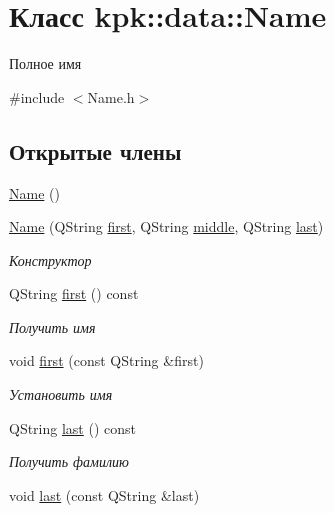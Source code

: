\hypertarget{classkpk_1_1data_1_1_name}{}\section{Класс kpk\+:\+:data\+:\+:Name}
\label{classkpk_1_1data_1_1_name}


Полное имя  




{\ttfamily \#include $<$Name.\+h$>$}

\subsection*{Открытые члены}
\begin{DoxyCompactItemize}
\item 
\hyperlink{classkpk_1_1data_1_1_name_a573dbf83b54bac09df5bc1deaeb65ea9}{Name} ()
\item 
\hyperlink{classkpk_1_1data_1_1_name_a4752b05c803f3431206341c55e580c4c}{Name} (Q\+String \hyperlink{classkpk_1_1data_1_1_name_aad406c47e17e1c528c8fb20b81ca0c0b}{first}, Q\+String \hyperlink{classkpk_1_1data_1_1_name_a6193fa09a5adf9ee2eb3a5a448578ec7}{middle}, Q\+String \hyperlink{classkpk_1_1data_1_1_name_a99905897dea9f8bb74ce3b7bddd9207d}{last})
\begin{DoxyCompactList}\small\item\em Конструктор \end{DoxyCompactList}\item 
Q\+String \hyperlink{classkpk_1_1data_1_1_name_aad406c47e17e1c528c8fb20b81ca0c0b}{first} () const 
\begin{DoxyCompactList}\small\item\em Получить имя \end{DoxyCompactList}\item 
void \hyperlink{classkpk_1_1data_1_1_name_aeb7429226a0130c4fe668fafd12e8020}{first} (const Q\+String \&first)
\begin{DoxyCompactList}\small\item\em Установить имя \end{DoxyCompactList}\item 
Q\+String \hyperlink{classkpk_1_1data_1_1_name_a99905897dea9f8bb74ce3b7bddd9207d}{last} () const 
\begin{DoxyCompactList}\small\item\em Получить фамилию \end{DoxyCompactList}\item 
void \hyperlink{classkpk_1_1data_1_1_name_a68d82b2f032a0dc4a61f66a542e365f8}{last} (const Q\+String \&last)

\end{DoxyCompactItemize}
